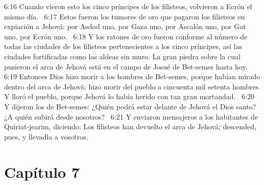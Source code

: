 6:16 Cuando vieron esto los cinco príncipes de los filisteos, volvieron a Ecrón el mismo día.  
6:17 Estos fueron los tumores de oro que pagaron los filisteos en expiación a Jehová: por Asdod uno, por Gaza uno, por Ascalón uno, por Gat uno, por Ecrón uno.  
6:18 Y los ratones de oro fueron conforme al número de todas las ciudades de los filisteos pertenecientes a los cinco príncipes, así las ciudades fortificadas como las aldeas sin muro. La gran piedra sobre la cual pusieron el arca de Jehová está en el campo de Josué de Bet-semes hasta hoy.  
6:19 Entonces Dios hizo morir a los hombres de Bet-semes, porque habían mirado dentro del arca de Jehová; hizo morir del pueblo a cincuenta mil setenta hombres. Y lloró el pueblo, porque Jehová lo había herido con tan gran mortandad.  
6:20 Y dijeron los de Bet-semes: ¿Quién podrá estar delante de Jehová el Dios santo? ¿A quién subirá desde nosotros?  
6:21 Y enviaron mensajeros a los habitantes de Quiriat-jearim, diciendo: Los filisteos han devuelto el arca de Jehová; descended, pues, y llevadla a vosotros.  
\section*{Capítulo 7 }

